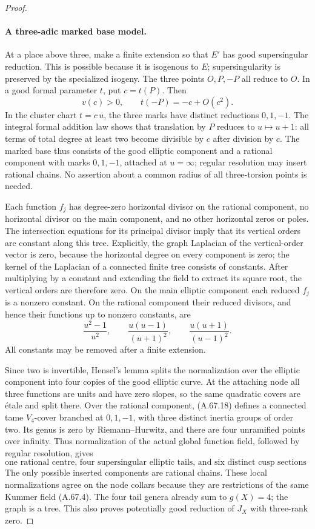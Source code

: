 \begin{proof}
\paragraph{A three-adic marked base model.}
At a place above three, make a finite extension so that \(E'\)
has good supersingular reduction. This is possible because it
is isogenous to \(E\); supersingularity is preserved by the
specialized isogeny. The three points \(O,P,-P\) all reduce to
\(O\). In a good formal parameter \(t\), put \(c=t(P)\). Then
\[
 v(c)>0,\qquad t(-P)=-c+O(c^2).
                                                               \tag{A.67.17}
\]
In the cluster chart \(t=c\,u\), the three marks have distinct
reductions \(0,1,-1\). The integral formal addition law shows
that translation by \(P\) reduces to \(u\mapsto u+1\):
all terms of total degree at least two become divisible by
\(c\) after division by \(c\). The marked base thus consists of
the good elliptic component and a rational component with
marks \(0,1,-1\), attached at \(u=\infty\); regular resolution
may insert rational chains. No assertion about a common
radius of all three-torsion points is needed.

Each function \(f_j\) has degree-zero horizontal divisor on
the rational component, no horizontal divisor on the main
component, and no other horizontal zeros or poles. The
intersection equations for its principal divisor imply that
its vertical orders are constant along this tree. Explicitly,
the graph Laplacian of the vertical-order vector is zero,
because the horizontal degree on every component is zero;
the kernel of the Laplacian of a connected finite tree consists
of constants. After multiplying by a constant and extending
the field to extract its square root, the vertical orders
are therefore zero. On the main elliptic component each
reduced \(f_j\) is a nonzero constant. On the rational
component their reduced divisors, and hence their functions
up to nonzero constants, are
\[
 \frac{u^2-1}{u^2},\qquad
 \frac{u(u-1)}{(u+1)^2},\qquad
 \frac{u(u+1)}{(u-1)^2}.
                                                               \tag{A.67.18}
\]
All constants may be removed after a finite extension.

Since two is invertible, Hensel's lemma splits the normalization
over the elliptic component into four copies of the good
elliptic curve. At the attaching node all three functions are
units and have zero slopes, so the same quadratic covers are
étale and split there. Over the rational component, (A.67.18)
defines a connected tame \(V_4\)-cover branched at \(0,1,-1\),
with three distinct inertia groups of order two. Its genus is
zero by Riemann--Hurwitz, and there are four unramified points
over infinity. Thus normalization of the actual global
function field, followed by regular resolution, gives
\[
 \text{one rational centre, four supersingular elliptic tails,
 and six distinct cusp sections on the centre.}                \tag{A.67.19}
\]
The only possible inserted components are rational chains.
These local normalizations agree on the node collars because
they are restrictions of the same Kummer field (A.67.4).
The four tail genera already sum to \(g(X)=4\); the graph is
a tree. This also proves potentially good reduction of \(J_X\)
with three-rank zero.


\end{proof}
